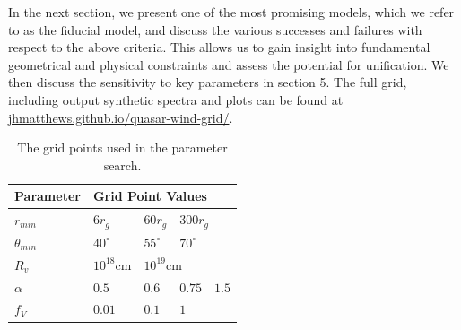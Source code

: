 \documentclass[useAMS,usenatbib]{mn2e_x}
\begin{document}

In the next section, we present one of the most promising models,
which we refer to as the fiducial model, and discuss
the various successes and failures with respect to the above criteria.
This allows us to gain insight into fundamental geometrical 
and physical constraints and assess the potential for unification. 
We then discuss the sensitivity to key parameters in section 5.
The full grid, including output synthetic spectra and plots can be found at
\url{jhmatthews.github.io/quasar-wind-grid/}.


\begin{table}
\begin{tabular}{p{2cm}p{1cm}p{1cm}p{1cm}p{1cm}}
Parameter & \multicolumn{4}{|l|}{Grid Point Values}  \\
\hline \hline 
$r_{min}$ 	&	 $6r_{g}$ & $60r_{g}$ & \multicolumn{2}{|l|}{$300r_{g}$} \\ 
$\theta_{min}$ 	&	 $40^{\circ}$ & $55^{\circ}$ & \multicolumn{2}{|l|}{$70^{\circ}$} \\ 
$R_v$  	        &	 $10^{18}$cm & \multicolumn{3}{|l|}{$10^{19}$cm} \\ 
$\alpha$ 	&	 $0.5$ & $0.6$ & $0.75$ & $1.5$ \\
$f_V$ 	&	 $0.01$ & $0.1$ & \multicolumn{2}{|l|}{$1$}  \\
\hline 
\end{tabular}
\caption{The grid points used in the parameter search.}
\label{grid_table}
\end{table}
\end{document}
